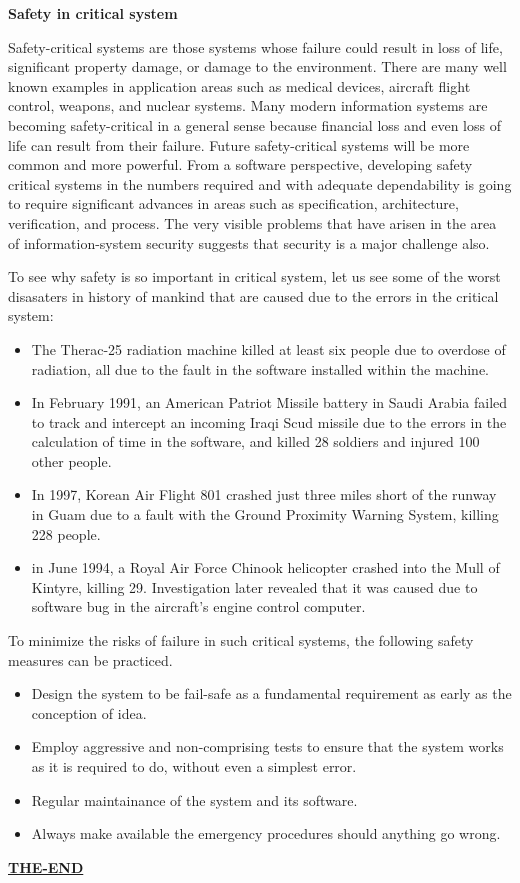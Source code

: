 \documentclass [12pt, a4paper]{article}
\begin{document}
\begin{center}
	\textbf{Safety in critical system}
\end{center}

Safety-critical systems are those systems whose failure could result in loss of life, significant property damage, or damage to the environment. There are many well known examples in application areas such as medical devices, aircraft flight control, weapons, and nuclear systems. Many modern information systems are becoming safety-critical in a general sense because financial loss and even loss of life can result from their failure. Future safety-critical systems will be more common and more powerful. From a software perspective, developing safety critical systems in the numbers required and with adequate dependability is going to require significant advances in areas such as specification, architecture, verification, and process. The very visible problems that have arisen in the area of information-system security suggests that security is a major challenge also.

To see why safety is so important in critical system, let us see some of the worst disasaters in history of mankind that are caused due to the errors in the critical system:

\begin{itemize}
	\item The Therac-25 radiation machine killed at least six people due to overdose of radiation, all due to the fault in the software installed within the machine.
	\item In February 1991, an American Patriot Missile battery in Saudi Arabia failed to track and intercept an incoming Iraqi Scud missile due to the errors in the calculation of time in the software, and killed 28 soldiers and injured 100 other people.
	\item In 1997, Korean Air Flight 801 crashed just three miles short of the runway in Guam due to a fault with the Ground Proximity Warning System, killing 228 people.
	\item in June 1994, a Royal Air Force Chinook helicopter crashed into the Mull of Kintyre, killing 29. Investigation later revealed that it was caused due to software bug in the aircraft's engine control computer.
\end{itemize}

To minimize the risks of failure in such critical systems, the following safety measures can be practiced.
\begin{itemize}
	\item Design the system to be fail-safe as a fundamental requirement as early as the conception of idea.
	\item Employ aggressive and non-comprising tests to ensure that the system works as it is required to do, without even a simplest error.
	\item Regular maintainance of the system and its software.
	\item Always make available the emergency procedures should anything go wrong.
\end{itemize}

\begin{center}
	\large
	\textbf{\underline{THE-END}}
\end{center}
\end{document}
